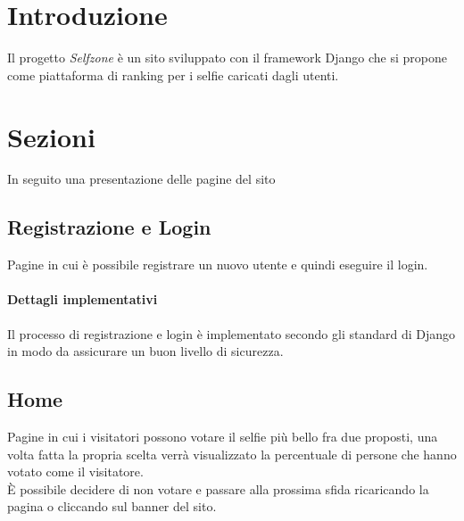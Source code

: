 \documentclass{article}
\newcommand{\proj}{\textit{Selfzone }}
\begin{document}
\section{Introduzione}
Il progetto \proj è un sito sviluppato con il framework Django che si propone come piattaforma di ranking per i selfie caricati dagli utenti.\\

\section{Sezioni}
In seguito una presentazione delle pagine del sito



\subsection{Registrazione e Login}
Pagine in cui è possibile registrare un nuovo utente e quindi eseguire il login.\\
\paragraph*{Dettagli implementativi}
Il processo di registrazione e login è implementato secondo gli standard di Django in modo da assicurare un buon livello di sicurezza.

\subsection{Home}
Pagine in cui i visitatori possono votare il selfie più bello fra due proposti, una volta fatta la propria scelta verrà visualizzato la percentuale di persone che hanno votato come il visitatore.\\
\`E possibile decidere di non votare e passare alla prossima sfida ricaricando la pagina o cliccando sul banner del sito.
\end{document}
